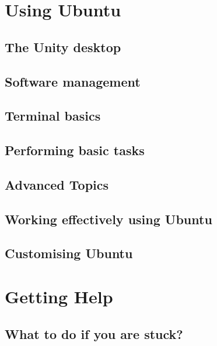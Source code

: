 \documentclass[10pt,a4paper,oneside,final,titlepage]{book}
\begin{document}
\part{Using Ubuntu}

\chapter{The Unity desktop} \label{chap:unity}


\chapter{Software management} \label{chap:software_management}


\chapter{Terminal basics} \label{chap:terminal}


\chapter{Performing basic tasks}


\chapter{Advanced Topics}


\chapter{Working effectively using Ubuntu}


\chapter{Customising Ubuntu} \label{chap:customise-ubuntu} 


\part{Getting Help}

\chapter{What to do if you are stuck?}

\end{document}
